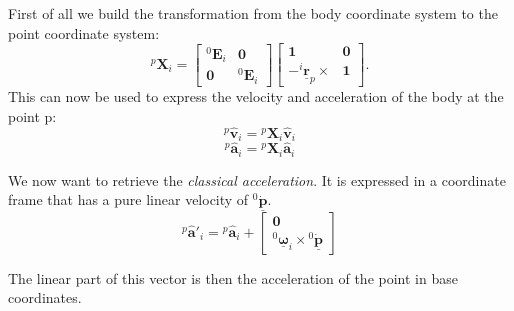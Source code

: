 \documentclass[a4paper]{article}
\newcommand{\Spa}[1]{\mathbf{\hat{#1}}}
\newcommand{\Nspa}[1]{\mathbf{\underline{#1}}}
\newcommand{\Vec}[1]{\mathbf{#1}}
\begin{document}
First of all we build the transformation from the body coordinate system to
the point coordinate system:
\begin{equation}
	{^p}\Vec{X}_i =
	\left[
	\begin{array}{cc}
		{^0}\Vec{E}_i & \Vec{0} \\
		\Vec{0} & {^0}\Vec{E}_i
	\end{array}
	\right]
	\left[
	\begin{array}{cc}
		\Vec{1} & \Vec{0} \\
		-{^i}\Nspa{r}_p \times & \Vec{1}
	\end{array}
	\right].
\end{equation}
This can now be used to express the velocity and acceleration of the body at
the point p:
\begin{equation}
	{^p}\Spa{v}_i = {^p}\Vec{X}_i \Spa{v}_i
\end{equation}
\begin{equation}
	{^p}\Spa{a}_i = {^p}\Vec{X}_i \Spa{a}_i
\end{equation}

We now want to retrieve the \emph{classical acceleration}. It is expressed in a
coordinate frame that has a pure linear velocity of ${^0}\Nspa{\dot{p}}$.
\begin{equation}
	{^p}\Spa{a}'_i = {^p}\Spa{a}_i +
	\left[
	\begin{array}{c}
		\Vec{0}\\
		{^0}\Nspa{\omega}_i \times {^0}\Nspa{\dot{p}}
	\end{array}
	\right]
\end{equation}

The linear part of this vector is then the acceleration of the point in base
coordinates.
\end{document}
